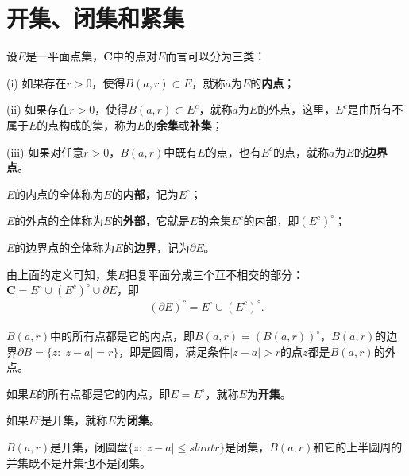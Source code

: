 \documentclass[../../main.tex]{subfiles}
\begin{document}
\section{开集、闭集和紧集}

\begin{definition}
设\(E\)是一平面点集，\(\mathbf{C}\)中的点对\(E\)而言可以分为三类：

(i) 如果存在\(r > 0\)，使得\(B(a, r) \subset E\)，就称\(a\)为\(E\)的\textbf{内点}；

(ii) 如果存在\(r > 0\)，使得\(B(a, r) \subset E^c\)，就称\(a\)为\(E\)的外点，这里，\(E^c\)是由所有不属于\(E\)的点构成的集，称为\(E\)的\textbf{余集}或\textbf{补集}；

(iii) 如果对任意\(r > 0\)，\(B(a, r)\)中既有\(E\)的点，也有\(E^c\)的点，就称\(a\)为\(E\)的\textbf{边界点}。
\end{definition}

\begin{definition}
\(E\)的内点的全体称为\(E\)的\textbf{内部}，记为\(E^\circ\)；

\(E\)的外点的全体称为\(E\)的\textbf{外部}，它就是\(E\)的余集\(E^c\)的内部，即\((E^c)^\circ\)；

\(E\)的边界点的全体称为\(E\)的\textbf{边界}，记为\(\partial E\)。
\end{definition}
\begin{note}
由上面的定义可知，集\(E\)把复平面分成三个互不相交的部分：\(\mathbf{C} = E^\circ \cup (E^c)^\circ \cup \partial E\)，即
\begin{align}\label{equation:::2318}
(\partial E)^c = E^\circ \cup (E^c)^\circ. 
\end{align}
\end{note}

\begin{example}[邻域的内部和边界]
\(B(a, r)\)中的所有点都是它的内点，即\(B(a, r) = (B(a, r))^\circ\)，\(B(a, r)\)的边界\(\partial B = \{ z : | z - a | = r \}\)，即是圆周，满足条件\(| z - a | > r\)的点\(z\)都是\(B(a, r)\)的外点。
\end{example}

\begin{definition}
如果\(E\)的所有点都是它的内点，即\(E = E^\circ\)，就称\(E\)为\textbf{开集}。

如果\(E^c\)是开集，就称\(E\)为\textbf{闭集}。
\end{definition}

\begin{example}
\(B(a, r)\)是开集，闭圆盘\(\{ z : | z - a | \leqslant slant r \}\)是闭集，\(B(a, r)\)和它的上半圆周的并集既不是开集也不是闭集。
\end{example}
\end{document}
